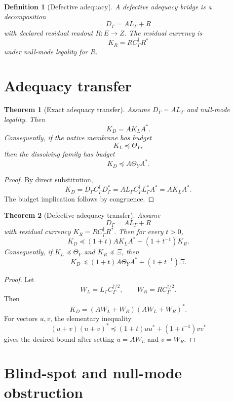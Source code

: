 \documentclass[11pt]{article}
\newtheorem{theorem}{Theorem}
\newtheorem{definition}{Definition}
\begin{document}
\begin{definition}[Defective adequacy]
A defective adequacy bridge is a decomposition
\[
        D_\Gamma = A L_\Gamma + R
\]
with declared residual readout \(R:E\to Z\).  The residual currency is
\[
        K_R = R C_\Gamma^\dagger R^*
\]
under null-mode legality for \(R\).
\end{definition}

\section{Adequacy transfer}

\begin{theorem}[Exact adequacy transfer]
Assume \(D_\Gamma=A L_\Gamma\) and null-mode legality.  Then
\[
        K_D = A K_L A^* .
\]
Consequently, if the native membrane has budget
\[
        K_L\preceq \Theta_Y ,
\]
then the dissolving family has budget
\[
        K_D\preceq A\Theta_Y A^* .
\]
\end{theorem}

\begin{proof}
By direct substitution,
\[
K_D = D_\Gamma C_\Gamma^\dagger D_\Gamma^*
    = A L_\Gamma C_\Gamma^\dagger L_\Gamma^* A^*
    = A K_L A^* .
\]
The budget implication follows by congruence.
\end{proof}

\begin{theorem}[Defective adequacy transfer]
Assume
\[
        D_\Gamma = A L_\Gamma + R
\]
with residual currency \(K_R=R C_\Gamma^\dagger R^*\).  Then for every
\(t>0\),
\[
\boxed{
        K_D
        \preceq
        (1+t)A K_L A^*
        +
        (1+t^{-1})K_R .
}
\]
Consequently, if \(K_L\preceq\Theta_Y\) and \(K_R\preceq \Xi\), then
\[
\boxed{
        K_D
        \preceq
        (1+t)A\Theta_YA^*
        +
        (1+t^{-1})\Xi .
}
\]
\end{theorem}

\begin{proof}
Let
\[
        W_L = L_\Gamma C_\Gamma^{\dagger/2},
        \qquad
        W_R = R C_\Gamma^{\dagger/2}.
\]
Then
\[
        K_D=(AW_L+W_R)(AW_L+W_R)^* .
\]
For vectors \(u,v\), the elementary inequality
\[
        (u+v)(u+v)^* \preceq (1+t)uu^*+(1+t^{-1})vv^*
\]
gives the desired bound after setting \(u=AW_L\) and \(v=W_R\).
\end{proof}

\section{Blind-spot and null-mode obstruction}
\end{document}
